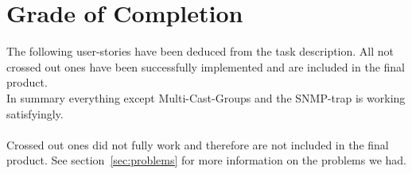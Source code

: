 \documentclass[11pt, a4paper]{article}
\begin{document}
\newpage

\section{Grade of Completion}

The following user-stories have been deduced from the task description. All not crossed out ones have been successfully implemented and are included in the final product. \\
In summary everything except Multi-Cast-Groups and the SNMP-trap is working satisfyingly.
\\\\
Crossed out ones did not fully work and therefore are not included in the final product. See section~\ref{sec:problems} for more information on the problems we had.
\end{document}
